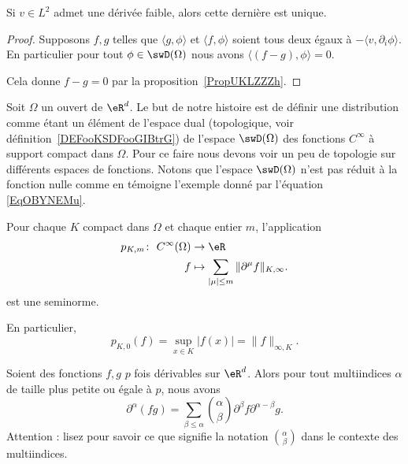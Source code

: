 \begin{lemma}
    Si \( v\in L^2\) admet une dérivée faible, alors cette dernière est unique.
\end{lemma}

\begin{proof}
    Supposons \( f,g\) telles que \( \langle g, \phi\rangle \) et \( \langle f, \phi\rangle \) soient tous deux égaux à \( -\langle v, \partial_i\phi\rangle \). En particulier pour tout \( \phi\in  \swD(\Omega)\) nous avons \( \langle (f-g), \phi\rangle =0\).

    Cela donne \( f-g=0\) par la proposition~\ref{PropUKLZZZh}.
\end{proof}

Soit \( \Omega\) un ouvert de \( \eR^d\). Le but de notre histoire est de définir une distribution comme étant un élément de l'espace dual (topologique, voir définition~\ref{DEFooKSDFooGIBtrG}) de l'espace \( \swD(\Omega)\) des fonctions \( C^{\infty}\) à support compact dans \( \Omega\). Pour ce faire nous devons voir un peu de topologie sur différents espaces de fonctions. Notons que l'espace \( \swD(\Omega)\) n'est pas réduit à la fonction nulle comme en témoigne l'exemple donné par l'équation \eqref{EqOBYNEMu}.

\begin{propositionDef}     \label{PROPooVZFHooKfSpfO}      %
    Pour chaque \( K\) compact dans \( \Omega\) et chaque entier \( m\), l'application
    \begin{equation}  \label{EQooZSQUooAJRIFe}
        \begin{aligned}
            p_{K,m}\colon \ C^{\infty}(\Omega)&\to \eR \\
            f&\mapsto  \sum_{| \mu |\leq m}\| \partial^{\mu}f \|_{K,\infty}.
        \end{aligned}
    \end{equation}
    est une seminorme.
\end{propositionDef}

En particulier,
\begin{equation}
    p_{K,0}(f)=\sup_{x\in K}| f(x) |=\| f \|_{\infty,K}.
\end{equation}

\begin{lemma}      \label{LEMooOLQTooEHJuBc}
    Soient des fonctions \( f,g\) \( p\) fois dérivables sur \( \eR^d\). Alors pour tout multiindices \( \alpha\) de taille plus petite ou égale à \( p\), nous avons
    \begin{equation}
        \partial^{\alpha}(fg)=\sum_{\beta\leq \alpha}\binom{ \alpha }{ \beta }\partial^{\beta}f\partial^{\alpha-\beta}g.
    \end{equation}
    Attention : lisez \cite{BIBooYDMJooGDtdbo} pour savoir ce que signifie la notation \( \binom{ \alpha }{ \beta } \) dans le contexte des multiindices.
\end{lemma}

